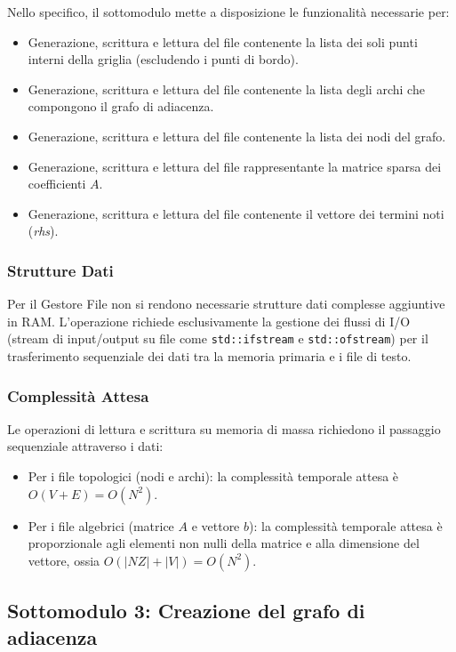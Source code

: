 \documentclass[twocolumn]{article}
\begin{document}
Nello specifico, il sottomodulo mette a disposizione le funzionalit\`a necessarie per:
\begin{itemize}
    \item Generazione, scrittura e lettura del file contenente la lista dei soli punti interni della griglia (escludendo i punti di bordo).
    \item Generazione, scrittura e lettura del file contenente la lista degli archi che compongono il grafo di adiacenza.
    \item Generazione, scrittura e lettura del file contenente la lista dei nodi del grafo.
    \item Generazione, scrittura e lettura del file rappresentante la matrice sparsa dei coefficienti $A$.
    \item Generazione, scrittura e lettura del file contenente il vettore dei termini noti (\textit{rhs}).
\end{itemize}

\subsubsection{Strutture Dati}
Per il Gestore File non si rendono necessarie strutture dati complesse aggiuntive in RAM. L'operazione richiede esclusivamente la gestione dei flussi di I/O (stream di input/output su file come \texttt{std::ifstream} e \texttt{std::ofstream}) per il trasferimento sequenziale dei dati tra la memoria primaria e i file di testo.

\subsubsection{Complessit\`a Attesa}
Le operazioni di lettura e scrittura su memoria di massa richiedono il passaggio sequenziale attraverso i dati:
\begin{itemize}
    \item Per i file topologici (nodi e archi): la complessit\`a temporale attesa \`e $O(V + E) = O(N^2)$.
    \item Per i file algebrici (matrice $A$ e vettore $b$): la complessit\`a temporale attesa \`e proporzionale agli elementi non nulli della matrice e alla dimensione del vettore, ossia $O(|NZ| + |V|) = O(N^2)$.
\end{itemize}

\subsection{Sottomodulo 3: Creazione del grafo di adiacenza}
\end{document}
